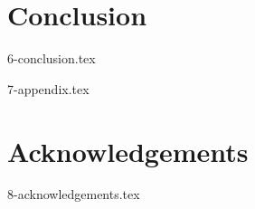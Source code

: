 \documentclass[a4paper,11pt]{report}
\begin{document}
\chapter{Conclusion}
{6-conclusion.tex}

\begin{appendices}
  {7-appendix.tex}
\end{appendices}

\chapter*{Acknowledgements}
{8-acknowledgements.tex}

\newpage

\renewcommand{\bibname}{References}



\end{document}
